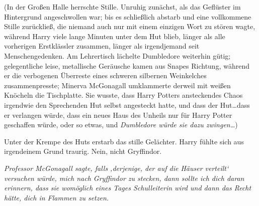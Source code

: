 (In der Großen Halle herrschte Stille. Unruhig zunächst, als das Geflüster im Hintergrund angeschwollen war; bis es schließlich abstarb und eine vollkommene Stille zurückließ, die niemand auch nur mit einem einzigen Wort zu stören wagte, während Harry viele lange Minuten unter dem Hut blieb, länger als alle vorherigen Erstklässler zusammen, länger als irgendjemand seit Menschengedenken. Am Lehrertisch lächelte Dumbledore weiterhin gütig; gelegentliche leise, metallische Geräusche kamen aus Snapes Richtung, während er die verbogenen Überreste eines schweren silbernen Weinkelches zusammenpresste; Minerva McGonagall umklammerte derweil mit weißen Knöcheln die Tischplatte. Sie wusste, dass Harry Potters ansteckendes Chaos irgendwie den Sprechenden Hut selbst angesteckt hatte, und dass der Hut…dass er verlangen würde, dass ein neues Haus des Unheils nur für Harry Potter geschaffen würde, oder so etwas, und \emph{Dumbledore würde sie dazu zwingen…})

Unter der Krempe des Huts erstarb das stille Gelächter. Harry fühlte sich aus irgendeinem Grund traurig. Nein, nicht Gryffindor.

\emph{Professor McGonagall sagte, falls ‚derjenige, der auf die Häuser verteilt‘ versuchen würde, mich nach Gryffindor zu stecken, dann sollte ich dich daran erinnern, dass sie womöglich eines Tages Schulleiterin wird und dann das Recht hätte, dich in Flammen zu setzen. }

